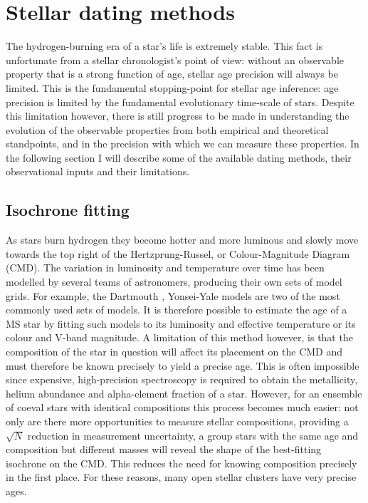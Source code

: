 \section{Stellar dating methods}

The hydrogen-burning era of a star's life is extremely stable.
This fact is unfortunate from a stellar chronologist's point of view: without
an observable property that is a strong function of age, stellar age precision
will always be limited.
This is the fundamental stopping-point for stellar age inference: age
precision is limited by the fundamental evolutionary time-scale of stars.
Despite this limitation however, there is still progress to be made in
understanding the evolution of the observable properties from both empirical
and theoretical standpoints, and in the precision with which we can measure
these properties.
In the following section I will describe some of the available dating methods,
their observational inputs and their limitations.

\subsection{Isochrone fitting}
As stars burn hydrogen they become hotter and more luminous and slowly move
towards the top right of the Hertzprung-Russel, or Colour-Magnitude Diagram
(CMD).
The variation in luminosity and temperature over time has been modelled by
several teams of astronomers, producing their own sets of model grids.
For example, the Dartmouth \citep{dotter}, Yonsei-Yale \citep{spada} models
are two of the most commonly used sets of models.
It is therefore possible to estimate the age of a MS star by fitting such
models to its luminosity and effective temperature or its colour and V-band
magnitude.
A limitation of this method however, is that the composition of the star in
question will affect its placement on the CMD and must therefore be known
precisely to yield a precise age.
This is often impossible since expensive, high-precision spectroscopy is
required to obtain the metallicity, helium abundance and alpha-element
fraction of a star.
However, for an ensemble of coeval stars with identical compositions this
process becomes much easier: not only are there more opportunities to measure
stellar compositions, providing a $\sqrt N$ reduction in measurement
uncertainty, a group stars with the same age and composition but different
masses will reveal the shape of the best-fitting isochrone on the CMD\@.
This reduces the need for knowing composition precisely in the first place.
For these reasons, many open stellar clusters have very precise ages.

